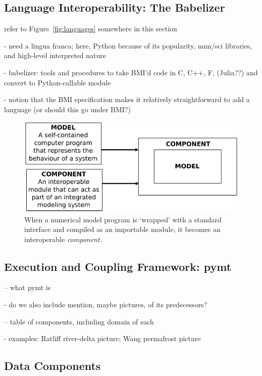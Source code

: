 \documentclass[12pt]{amsart}
\begin{document}
\subsection{Language Interoperability: The Babelizer}
\label{sec:babelizer}

refer to Figure~\ref{fig:languages} somewhere in this section

- need a lingua franca; here, Python because of its popularity, num/sci libraries, and high-level interpreted nature

- babelizer: tools and procedures to take BMI'd code in C, C++, F, (Julia??) and convert to Python-callable module



- notion that the BMI specification makes it relatively straightforward to add a language (or should this go under BMI?)

\begin{figure}[h!]
\centering
\includegraphics[scale=0.5]{Figures/model_to_component.pdf}
\caption{When a numerical model program is `wrapped' with a standard interface and compiled as an importable module, it becomes an interoperable \textit{component}.}
\label{fig:component}
\end{figure}


\subsection{Execution and Coupling Framework: pymt}

-- what pymt is

- do we also include mention, maybe pictures, of its predecessors?

-- table of components, including domain of each

- examples: Ratliff river-delta picture; Wang permafrost picture

\subsection{Data Components}
\end{document}
